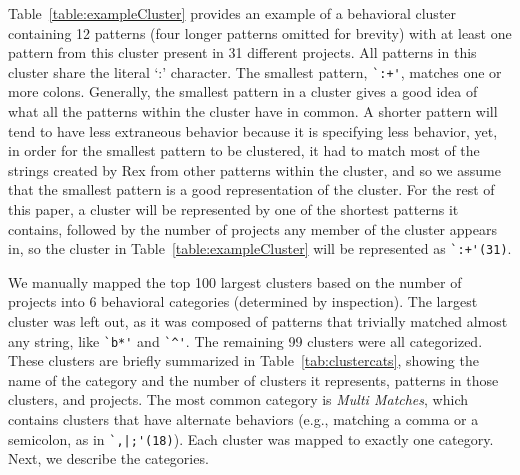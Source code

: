 


Table~\ref{table:exampleCluster} provides an example of a behavioral cluster containing 12 patterns (four longer patterns omitted for brevity) with at least one pattern from this cluster present in 31 different projects.  All patterns in this cluster share the literal `:' character.
The smallest pattern, \verb!`:+'!,  matches one or more colons. Generally, the smallest pattern in a cluster gives a good idea of what all the patterns within the cluster have in common.
 A shorter pattern will tend to have less extraneous behavior because it is specifying less behavior,
yet, in order for the smallest pattern to be clustered, it had to match most of the strings created by Rex from other patterns within the cluster, and so we assume that {the smallest pattern is a good representation of the cluster}.
For the rest of this paper, a cluster will be represented by one of the shortest patterns it contains, followed by the number of projects any member of the cluster appears in, so the cluster in Table~\ref{table:exampleCluster} will be represented as \verb!`:+'(31)!.

We manually mapped the top 100 largest clusters based on the number of projects into 6 behavioral categories (determined by inspection).  The largest cluster was left out, as it was composed of patterns that trivially matched almost any string, like \verb!`b*'! and \verb!`^'!.  The remaining 99 clusters were all categorized. These clusters are briefly summarized in Table~\ref{tab:clustercats}, showing the name of the category and the number of clusters it represents, patterns in those clusters, and projects. The most common category is \emph{Multi Matches}, which contains clusters that have alternate behaviors (e.g., matching a comma or a semicolon, as in \verb!`,|;'(18)!). Each cluster was mapped to exactly one category. Next, we describe the categories. %


